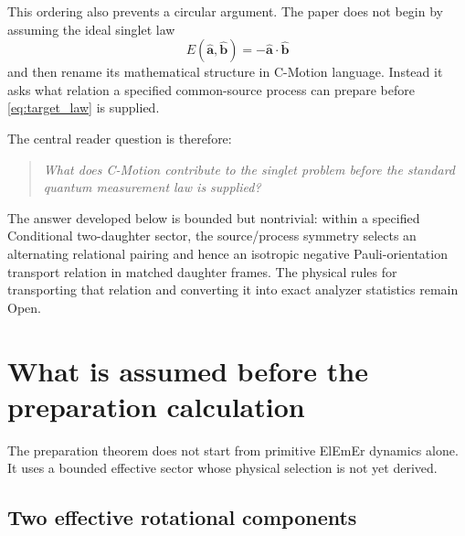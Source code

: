 \documentclass[11pt]{article}
\theoremstyle{remark}
\newcommand{\cmotion}{\mbox{C-Motion}}
\newcommand{\ElEmEr}{\mbox{ElEmEr}}
\newcommand{\ahat}{\hat{\bm a}}
\newcommand{\bhat}{\hat{\bm b}}
\begin{document}
This ordering also prevents a circular argument.  The paper does not begin by assuming the
ideal singlet law
\begin{equation}
  E(\ahat,\bhat)=-\ahat\cdot\bhat
  \label{eq:target_law}
\end{equation}
and then rename its mathematical structure in \cmotion{} language.  Instead it asks what relation a
specified common-source process can prepare before \eqref{eq:target_law} is supplied.

The central reader question is therefore:
\begin{quote}
\emph{What does \cmotion{} contribute to the singlet problem before the standard quantum measurement
law is supplied?}
\end{quote}
The answer developed below is bounded but nontrivial: within a specified Conditional two-daughter
sector, the source/process symmetry selects an alternating relational pairing and hence an isotropic
negative Pauli-orientation transport relation in matched daughter frames.  The physical
rules for transporting that relation and converting it into exact analyzer statistics remain Open.

\section{What is assumed before the preparation calculation}
\label{sec:conditional_sector}

The preparation theorem does not start from primitive \ElEmEr{} dynamics alone.  It uses a bounded
effective sector whose physical selection is not yet derived.

\subsection{Two effective rotational components}
\end{document}
